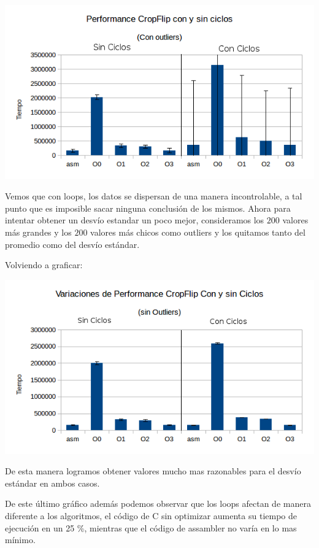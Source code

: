 \documentclass[a4paper]{article}
\begin{document}
\begin{center}
  \includegraphics[scale=0.66]{Graficos1.4/1.3/perConOut.png}
\end{center}

Vemos que con loops, los datos se dispersan de una manera incontrolable, a tal punto que es imposible sacar ninguna conclusión de los mismos. Ahora para intentar obtener un desvío estandar un poco mejor, consideramos los $200$ valores más grandes y los $200$ valores más chicos como outliers y los quitamos tanto del promedio como del desvío estándar.

Volviendo a graficar:

\begin{center}
  \includegraphics[scale=0.66]{Graficos1.4/1.3/perSinOut.png}
\end{center}

De esta manera logramos obtener valores mucho mas razonables para el desvío estándar en ambos casos.

De este último gráfico además podemos observar que los loops afectan de manera diferente a los algoritmos, el código de C sin optimizar aumenta su tiempo de ejecución en un 25 \%, mientras que el código de assambler no varía en lo mas mínimo.
\end{document}

